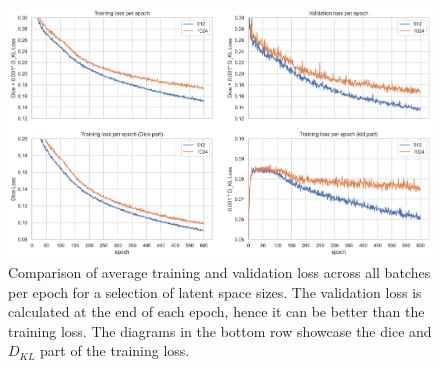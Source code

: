 \begin{figure}[htbp]
  \centering
  \includegraphics[width=450pt]{figures/vae_latent_space_train_comp}
  \caption{
  Comparison of average training and validation loss across all batches per epoch for a selection of latent space sizes.
  The validation loss is calculated at the end of each epoch, hence it can be better than the training loss.
  The diagrams in the bottom row showcase the dice and $D_{KL}$ part of the training loss.
  }\label{vae_latent_space_train_comp}
\end{figure}







